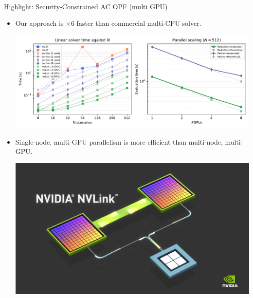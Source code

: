 \begin{frame}{Highlight: Security-Constrained AC OPF {\normalsize (multi GPU)}}
  \vspace{.1in} 
  \begin{itemize}
  \item<1-> Our approach is $\times 6$ faster than commercial multi-CPU solver.
    \begin{center}
      \includegraphics[height=.45\textheight]{kkt_timings.pdf}
    \end{center}
  \item<2-> Single-node, multi-GPU parallelism is more efficient than multi-node, multi-GPU.
    \begin{center}
      \includegraphics[height=.3\textheight]{nvlink.png}
    \end{center}
  \end{itemize}
\end{frame}


